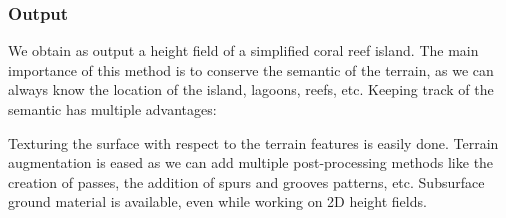 \subsubsection{Output}
We obtain as output a height field of a simplified coral reef island. The main importance of this method is to conserve the semantic of the terrain, as we can always know the location of the island, lagoons, reefs, etc. Keeping track of the semantic has multiple advantages:
\begin{Itemize}
    \Item{} Texturing the surface with respect to the terrain features is easily done.
    \Item{} Terrain augmentation is eased as we can add multiple post-processing methods like the creation of passes, the addition of spurs and grooves patterns, etc.
    \Item{} Subsurface ground material is available, even while working on 2D height fields.
\end{Itemize}


